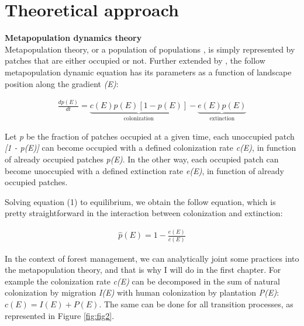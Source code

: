 

\section{Theoretical approach}\label{ta}

\textbf{Metapopulation dynamics theory} \\
Metapopulation theory, or a population of populations \parencite{Levins1968}, is simply represented by patches that are either occupied or not.
Further extended by \textcite{Holt2000a}, the follow metapopulation dynamic equation has its parameters as a function of landscape position along the gradient \textit{(E)}:

\begin{align}
\frac{dp(E)}{dt} = \underbrace{c(E)p(E)[1 - p(E)]}_\text{colonization} - \underbrace{e(E)p(E)}_\text{extinction}
\end{align}

Let \textit{p} be the fraction of patches occupied at a given time, each unoccupied patch \textit{[1 - p(E)]} can become occupied with a defined colonization rate \textit{c(E)}, in function of already occupied patches \textit{p(E)}. In the other way, each occupied patch can become unoccupied with a defined extinction rate \textit{e(E)}, in function of already occupied patches.

Solving equation (1) to equilibrium, we obtain the follow equation, which is pretty straightforward in the interaction between colonization and extinction:

\begin{align}
\hat{p}(E) = 1 - \frac{e(E)}{c(E)}
\end{align}

In the context of forest management, we can analytically joint some practices into the metapopulation theory, and that is why I will do in the first chapter.
For example the colonization rate \textit{c(E)} can be decomposed in the sum of natural colonization by migration \textit{I(E)} with human colonization by plantation \textit{P(E)}: $c(E) = I(E) + P(E)$.
The same can be done for all transition processes, as represented in Figure \ref{fig:fig2}.


